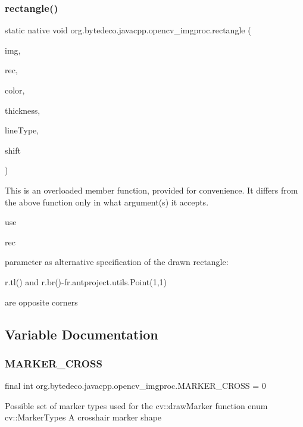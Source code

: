 \subsubsection{\texorpdfstring{rectangle()}{rectangle()}\hspace{0.1cm}{\footnotesize\ttfamily [2/2]}}
{\footnotesize\ttfamily static native void org.\+bytedeco.\+javacpp.\+opencv\+\_\+imgproc.\+rectangle (\begin{DoxyParamCaption}\item[{@By\+Ref Mat}]{img,  }\item[{@By\+Val Rect}]{rec,  }\item[{@Const @By\+Ref Scalar}]{color,  }\item[{int}]{thickness,  }\item[{int}]{line\+Type,  }\item[{int}]{shift }\end{DoxyParamCaption})\hspace{0.3cm}{\ttfamily [static]}}

This is an overloaded member function, provided for convenience. It differs from the above function only in what argument(s) it accepts. 

use
\begin{DoxyCode}
rec 
\end{DoxyCode}
 parameter as alternative specification of the drawn rectangle\+:
\begin{DoxyCode}
 r.tl() and
r.br()-fr.antproject.utils.Point(1,1)
\end{DoxyCode}
 are opposite corners 

\subsection{Variable Documentation}
\mbox{\label{group__imgproc__draw_gad3b5af2fc44e8c67ac0c7f607d59d724}} 
\subsubsection{\texorpdfstring{M\+A\+R\+K\+E\+R\+\_\+\+C\+R\+O\+SS}{MARKER\_CROSS}}
{\footnotesize\ttfamily final int org.\+bytedeco.\+javacpp.\+opencv\+\_\+imgproc.\+M\+A\+R\+K\+E\+R\+\_\+\+C\+R\+O\+SS = 0\hspace{0.3cm}{\ttfamily [static]}}

Possible set of marker types used for the cv\+::draw\+Marker function enum cv\+::\+Marker\+Types A crosshair marker shape 